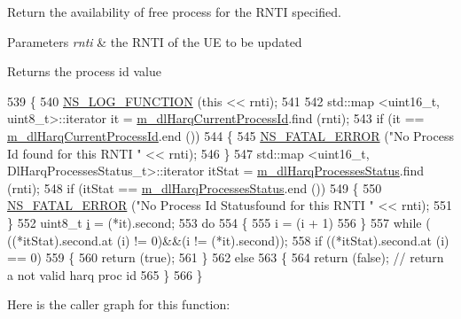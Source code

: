 Return the availability of free process for the R\+N\+TI specified. 


\begin{DoxyParams}{Parameters}
{\em rnti} & the R\+N\+TI of the UE to be updated \\
\hline
\end{DoxyParams}
\begin{DoxyReturn}{Returns}
the process id value 
\end{DoxyReturn}

\begin{DoxyCode}
539 \{
540   \hyperlink{log-macros-disabled_8h_a90b90d5bad1f39cb1b64923ea94c0761}{NS\_LOG\_FUNCTION} (\textcolor{keyword}{this} << rnti);
541 
542   std::map <uint16\_t, uint8\_t>::iterator it = \hyperlink{classns3_1_1FdBetFfMacScheduler_a7c1cfb93fd3fa63e6811486c023934c2}{m\_dlHarqCurrentProcessId}.find (rnti);
543   \textcolor{keywordflow}{if} (it == \hyperlink{classns3_1_1FdBetFfMacScheduler_a7c1cfb93fd3fa63e6811486c023934c2}{m\_dlHarqCurrentProcessId}.end ())
544     \{
545       \hyperlink{group__fatal_ga5131d5e3f75d7d4cbfd706ac456fdc85}{NS\_FATAL\_ERROR} (\textcolor{stringliteral}{"No Process Id found for this RNTI "} << rnti);
546     \}
547   std::map <uint16\_t, DlHarqProcessesStatus\_t>::iterator itStat = 
      \hyperlink{classns3_1_1FdBetFfMacScheduler_a93d8bf3298e9b289d9fcf70571b27b78}{m\_dlHarqProcessesStatus}.find (rnti);
548   \textcolor{keywordflow}{if} (itStat == \hyperlink{classns3_1_1FdBetFfMacScheduler_a93d8bf3298e9b289d9fcf70571b27b78}{m\_dlHarqProcessesStatus}.end ())
549     \{
550       \hyperlink{group__fatal_ga5131d5e3f75d7d4cbfd706ac456fdc85}{NS\_FATAL\_ERROR} (\textcolor{stringliteral}{"No Process Id Statusfound for this RNTI "} << rnti);
551     \}
552   uint8\_t \hyperlink{bernuolliDistribution_8m_a6f6ccfcf58b31cb6412107d9d5281426}{i} = (*it).second;
553   \textcolor{keywordflow}{do}
554     \{
555       i = (i + 1) %
556     \}
557   \textcolor{keywordflow}{while} ( ((*itStat).second.at (i) != 0)&&(i != (*it).second));
558   \textcolor{keywordflow}{if} ((*itStat).second.at (i) == 0)
559     \{
560       \textcolor{keywordflow}{return} (\textcolor{keyword}{true});
561     \}
562   \textcolor{keywordflow}{else}
563     \{
564       \textcolor{keywordflow}{return} (\textcolor{keyword}{false}); \textcolor{comment}{// return a not valid harq proc id}
565     \}
566 \}
\end{DoxyCode}


Here is the caller graph for this function\+:


